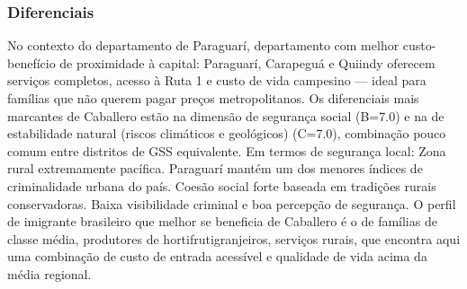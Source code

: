 \subsubsection*{Diferenciais}\label{dif-caballero-0904}
No contexto do departamento de Paraguarí, departamento com melhor custo-benefício de proximidade à capital: Paraguarí, Carapeguá e Quiindy oferecem serviços completos, acesso à Ruta 1 e custo de vida campesino — ideal para famílias que não querem pagar preços metropolitanos. Os diferenciais mais marcantes de Caballero estão na dimensão de segurança social (B=7.0) e na de estabilidade natural (riscos climáticos e geológicos) (C=7.0), combinação pouco comum entre distritos de GSS equivalente. Em termos de segurança local: Zona rural extremamente pacífica. Paraguarí mantém um dos menores índices de criminalidade urbana do país. Coesão social forte baseada em tradições rurais conservadoras. Baixa visibilidade criminal e boa percepção de segurança. O perfil de imigrante brasileiro que melhor se beneficia de Caballero é o de famílias de classe média, produtores de hortifrutigranjeiros, serviços rurais, que encontra aqui uma combinação de custo de entrada acessível e qualidade de vida acima da média regional.

